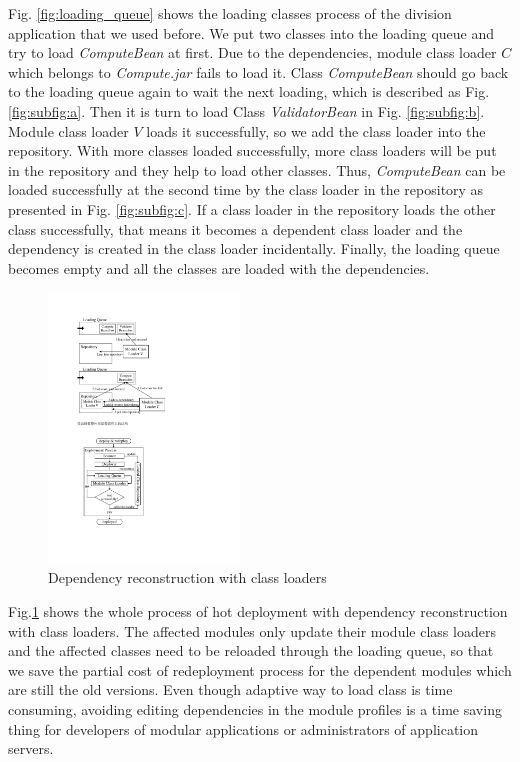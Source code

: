 \documentclass[conference]{IEEEtran}
\begin{document}
Fig. \ref{fig:loading_queue} shows the loading classes process of the division application that we used before. 
We put two classes into the loading queue and try to load \emph{ComputeBean} at first. 
Due to the dependencies, module class loader $C$ which belongs to \emph{Compute.jar} fails to load it. 
Class \emph{ComputeBean} should go back to the loading queue again to wait the next loading, which is described as Fig. \ref{fig:subfig:a}. 
Then it is turn to load Class \emph{ValidatorBean} in Fig. \ref{fig:subfig:b}. 
Module class loader $V$ loads it successfully, so we add the class loader into the repository. 
With more classes loaded successfully, more class loaders will be put in the repository and they help to load other classes. 
Thus, \emph{ComputeBean} can be loaded successfully at the second time by the class loader in the repository as presented in Fig. \ref{fig:subfig:c}.
If a class loader in the repository loads the other class successfully, that means it becomes a dependent class loader and the dependency is created in the class loader incidentally. 
Finally, the loading queue becomes empty and all the classes are loaded with the dependencies.



\begin{figure}[ht]
\centering
\includegraphics[width=2.0in]{ProcessReconstructionCL.pdf}
\caption{Dependency reconstruction with class loaders}
\label{fig:reconstruction_CL}
\end{figure}

Fig.\ref{fig:reconstruction_CL} shows the whole process of hot deployment with dependency reconstruction with class loaders. 
The affected modules only update their module class loaders and the affected classes need to be reloaded through the loading queue, so that we save the partial cost of redeployment process for the dependent modules which are still the old versions. 
Even though adaptive way to load class is time consuming, avoiding editing dependencies in the module profiles is a time saving thing for developers of modular applications or administrators of application servers.
\end{document}
